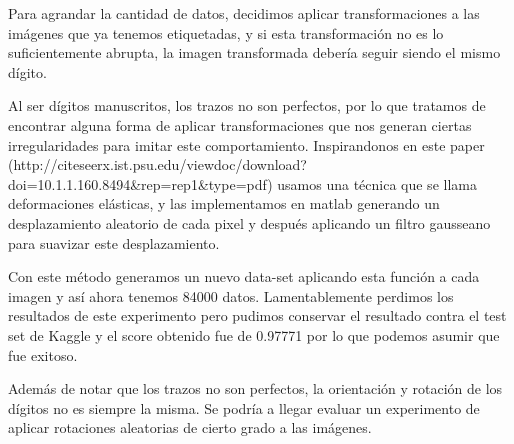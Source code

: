 Para agrandar la cantidad de datos, decidimos aplicar transformaciones a las imágenes que ya tenemos etiquetadas, y si esta transformación no es lo suficientemente abrupta, la imagen transformada debería seguir siendo el mismo dígito.

Al ser dígitos manuscritos, los trazos no son perfectos, por lo que tratamos de encontrar alguna forma de aplicar transformaciones que nos generan ciertas irregularidades para imitar este comportamiento. Inspirandonos en este paper (http://citeseerx.ist.psu.edu/viewdoc/download?doi=10.1.1.160.8494\&rep=rep1\&type=pdf)
usamos una técnica que se llama deformaciones elásticas, y las implementamos en matlab generando un desplazamiento aleatorio de cada pixel y después aplicando un filtro gausseano para suavizar este desplazamiento. 

Con este método generamos un nuevo data-set aplicando esta función a cada imagen y así ahora tenemos 84000 datos. Lamentablemente perdimos los resultados de este experimento pero pudimos conservar el resultado contra el test set de Kaggle y el score obtenido fue de 0.97771 por lo que podemos asumir que fue exitoso.

Además de notar que los trazos no son perfectos, la orientación y rotación de los dígitos no es siempre la misma. Se podría a llegar evaluar un experimento de aplicar rotaciones aleatorias de cierto grado a las imágenes.
